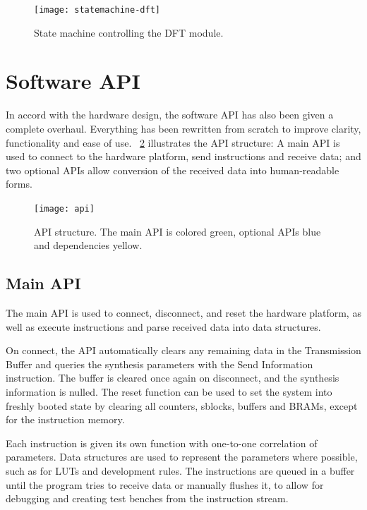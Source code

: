 \begin{figure}[!ht]
    \centering
    \texttt{[image: statemachine-dft]}
    \caption[DFT state machine]{
        State machine controlling the DFT module.
    }
    \label{fig:statemachine-dft}
\end{figure}


\section{Software API}

In accord with the hardware design, the software API has also been given a complete overhaul.
Everything has been rewritten from scratch to improve clarity, functionality and ease of use.
\figurename~\ref{fig:api} illustrates the API structure: A main API is used to connect to the hardware platform, send instructions and receive data; and two optional APIs allow conversion of the received data into human-readable forms.

\begin{figure}[!ht]
    \centering
    \texttt{[image: api]}
    \caption[API]{
        API structure.
        The main API is colored green, optional APIs blue and dependencies yellow.
    }
    \label{fig:api}
\end{figure}

\subsection{Main API}

The main API is used to connect, disconnect, and reset the hardware platform, as well as execute instructions and parse received data into data structures.

On connect, the API automatically clears any remaining data in the Transmission Buffer and queries the synthesis parameters with the Send Information instruction.
The buffer is cleared once again on disconnect, and the synthesis information is nulled.
The reset function can be used to set the system into freshly booted state by clearing all counters, sblocks, buffers and BRAMs, except for the instruction memory.

Each instruction is given its own function with one-to-one correlation of parameters.
Data structures are used to represent the parameters where possible, such as for LUTs and development rules.
The instructions are queued in a buffer until the program tries to receive data or manually flushes it, to allow for debugging and creating test benches from the instruction stream.

